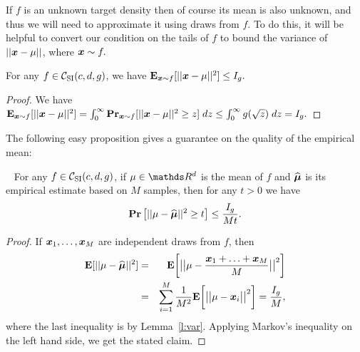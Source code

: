 
If $f$ is an unknown target density then of course its mean 
is also unknown, and thus we will need to approximate it
using draws from $f$. 
To do this, it will be helpful to convert our condition on the tails
of $f$ to bound the variance of $|| \boldsymbol{x} - \mu ||$, where $\boldsymbol{x} \sim f.$
\begin{lemma}
\label{l:var}
For any $f \in {\mathcal C}_{\mathrm{SI}}(c, d, g)$, we have
$
\operatorname{{\bf E}}_{\boldsymbol{x} \sim f} [ || \boldsymbol{x} - \mu ||^2 ] \leq  I_g.
$
\end{lemma}
\begin{proof}
We have
$
\operatorname{{\bf E}}_{\boldsymbol{x} \sim f} [ || \boldsymbol{x} - \mu ||^2 ]
 = \int_0^{\infty} \operatorname{{\bf Pr}}_{\boldsymbol{x} \sim f} [ || \boldsymbol{x} - \mu ||^2 \geq z ] \; dz
 \leq \int_0^{\infty} g(\sqrt{z}) \; dz
 = I_g.
$
\end{proof}

The following easy proposition gives a guarantee on the quality of the empirical mean: 
\begin{lemma}~\label{lem:estimate-mean}
For any $f \in {\mathcal C}_{\mathrm{SI}}(c,d,g)$,
if $\mu \in \R^d$ is the mean of $f$ and $\widehat{\boldsymbol{\mu}}$
is its empirical estimate based on $M$ samples, then 
for any $t>0$ we have
\[
\operatorname{{\bf Pr}}\big[ || \mu-\widehat{\boldsymbol{\mu}} ||^2 \ge t \big]   \le \frac{I_g}{M t}.
\]
\end{lemma}
\begin{proof} 
If $\boldsymbol{x}_1, \ldots, \boldsymbol{x}_M$ are independent draws from $f$, then 
\begin{eqnarray*}
\mathbf{E}[|| \mu  -\widehat{\boldsymbol{\mu}} ||^2] 
 &=& \mathbf{E}\bigg[\big|\big|\mu  -\frac{\boldsymbol{x}_1+ \ldots + \boldsymbol{x}_M}{M}\big|\big|^2 \bigg] \\ 
 &=& \sum_{i=1}^M \frac{1}{M^2} 
  \mathbf{E}\bigg[\big|\big|\mu  - \boldsymbol{x}_i \big|\big|^2 \bigg] 
  = \frac{I_g}{M},
\end{eqnarray*}
where the last inequality is by Lemma~\ref{l:var}.
Applying Markov's inequality on the left hand side, we get the stated claim. 
\end{proof}




